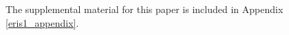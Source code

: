 \documentclass[11pt, twoside]{report}
\begin{document}
The supplemental material for this paper is included in Appendix \ref{eris1_appendix}.





\end{document}
